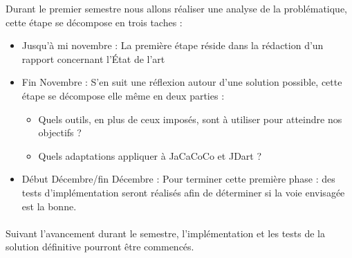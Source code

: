 
Durant le premier semestre nous allons réaliser une analyse de la problématique, cette étape se décompose en trois taches :
\begin{itemize}
	\item Jusqu'à mi novembre : La première étape réside dans la rédaction d'un rapport concernant l'État de l'art
	\item Fin Novembre : S'en suit une réflexion autour d'une solution possible, cette étape se décompose elle même en deux parties :
		\begin{itemize}
		 \item Quels outils, en plus de ceux imposés, sont à utiliser pour atteindre nos objectifs ?
		 \item Quels adaptations appliquer à JaCaCoCo et JDart ?	
		\end{itemize}	
	\item Début Décembre/fin Décembre : Pour terminer cette première phase : des tests d'implémentation seront réalisés afin de déterminer si la voie envisagée est la bonne.
\end{itemize}
	
\paragraph{}
Suivant l'avancement durant le semestre, l'implémentation et les tests de la solution définitive pourront être commencés.